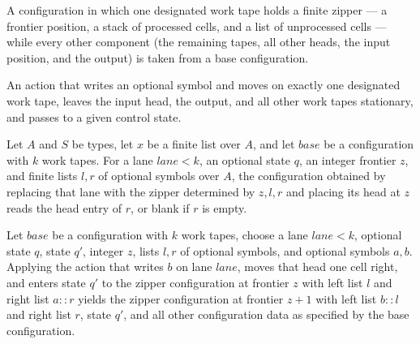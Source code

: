 \begin{definition}
\label{Turing.timed_laneCfg}
\leanok
{}
A configuration in which one designated work tape holds a finite zipper --- a
frontier position, a stack of processed cells, and a list of unprocessed cells
--- while every other component (the remaining tapes, all other heads, the
input position, and the output) is taken from a base configuration.
\end{definition}

\begin{definition}
\label{Turing.timed_laneAction}
\leanok
{}
An action that writes an optional symbol and moves on exactly one designated
work tape, leaves the input head, the output, and all other work tapes
stationary, and passes to a given control state.
\end{definition}

\begin{lemma}
\label{Turing.timed_laneCfg_read}
\leanok
{}
Let $A$ and $S$ be types, let $x$ be a finite list over $A$, and let $base$ be a
configuration with $k$ work tapes. For a lane $lane<k$, an optional state $q$, an
integer frontier $z$, and finite lists $l,r$ of optional symbols over $A$, the
configuration obtained by replacing that lane with the zipper determined by $z,l,r$ and
placing its head at $z$ reads the head entry of $r$, or blank if $r$ is empty.
\end{lemma}

\begin{lemma}
\label{Turing.timed_laneCfg_right}
\leanok
{}
Let $base$ be a configuration with $k$ work tapes, choose a lane $lane<k$, optional
state $q$, state $q'$, integer $z$, lists $l,r$ of optional symbols, and optional
symbols $a,b$. Applying the action that writes $b$ on lane $lane$, moves that head one
cell right, and enters state $q'$ to the zipper configuration at frontier $z$ with left
list $l$ and right list $a::r$ yields the zipper configuration at frontier $z+1$ with
left list $b::l$ and right list $r$, state $q'$, and all other configuration data as
specified by the base configuration.
\end{lemma}

